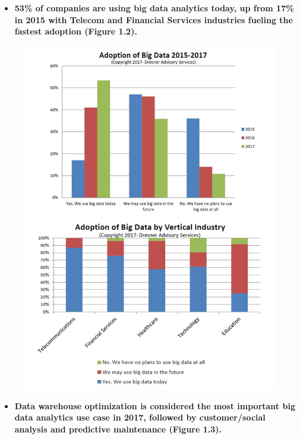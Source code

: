 \documentclass[]{book}
\providecommand{\tightlist}{%
  \setlength{\itemsep}{0pt}\setlength{\parskip}{0pt}}
\begin{document}
\begin{itemize}
\tightlist
\item
  \textbf{53\% of companies are using big data analytics today, up from
  17\% in 2015 with Telecom and Financial Services industries fueling
  the fastest adoption (Figure 1.2).}
\end{itemize}

\begin{figure}
\centering
\includegraphics{2.jpg}
\caption{}
\end{figure}

\begin{itemize}
\tightlist
\item
  \textbf{Data warehouse optimization is considered the most important
  big data analytics use case in 2017, followed by customer/social
  analysis and predictive maintenance (Figure 1.3).}
\end{itemize}
\end{document}
